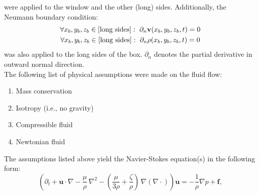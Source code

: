 were applied to the window and the other (long) sides. Additionally, the Neumann boundary condition:
\begin{gather}
    \forall x_b,y_b,z_b \in [\text{long sides}]:~\partial_n \mathbf{v}(x_b,y_b,z_b, t) = 0 \\
    \forall x_b,y_b,z_b \in [\text{long sides}]:~\partial_n \rho(x_b,y_b,z_b, t) = 0
\end{gather}
was also applied to the long sides of the box. $\partial_n$ denotes the partial derivative in outward normal direction. \\


The following list of physical assumptions were made on the fluid flow:
\begin{multicols}{2}
\begin{enumerate}
    \item Mass conservation
    \item Isotropy (i.e., no gravity)
    \item Compressible fluid
    \item Newtonian fluid
\end{enumerate}
\end{multicols}

The assumptions listed above yield the Navier-Stokes equation(s) \cite{batchelor2000introduction} in the following form:
\begin{equation}
{\left(\partial_t +\mathbf {u} \cdot \nabla -\frac{\mu}{\rho} \,\nabla ^{2}-\left(\frac{\mu}{3\rho} +\frac{\zeta}{\rho} \right)\,\nabla (\nabla \cdot )\right)\mathbf {u} =-{\frac {1}{\rho }}\nabla p+\mathbf {f} ,}
\end{equation}

